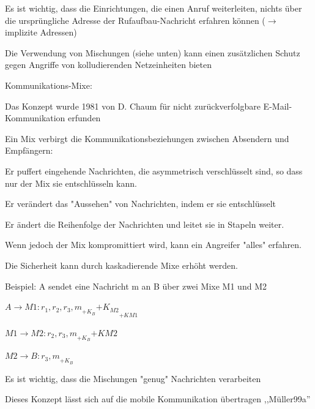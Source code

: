 \documentclass[a4paper]{article}
\begin{document}
\begin{multicols}{3}
\begin{itemize*}
\begin{itemize*}
\begin{itemize*}
                        \item Es ist wichtig, dass die Einrichtungen, die einen Anruf weiterleiten, nichts über die ursprüngliche Adresse der Rufaufbau-Nachricht erfahren können ($\rightarrow$ implizite Adressen)
                        \item Die Verwendung von Mischungen (siehe unten) kann einen zusätzlichen Schutz gegen Angriffe von kolludierenden Netzeinheiten bieten
                  \end{itemize*}
            \end{itemize*}
            \item Kommunikations-Mixe:
            \begin{itemize*}
                  \item Das Konzept wurde 1981 von D. Chaum für nicht zurückverfolgbare E-Mail-Kommunikation erfunden
                  \item Ein Mix verbirgt die Kommunikationsbeziehungen zwischen Absendern und Empfängern:
                  \begin{itemize*}
                        \item Er puffert eingehende Nachrichten, die asymmetrisch verschlüsselt sind, so dass nur der Mix sie entschlüsseln kann.
                        \item Er verändert das "Aussehen" von Nachrichten, indem er sie entschlüsselt
                        \item Er ändert die Reihenfolge der Nachrichten und leitet sie in Stapeln weiter.
                        \item Wenn jedoch der Mix kompromittiert wird, kann ein Angreifer "alles" erfahren.
                  \end{itemize*}
                  \item Die Sicherheit kann durch kaskadierende Mixe erhöht werden.
                  \item Beispiel: A sendet eine Nachricht m an B über zwei Mixe M1 und M2
                  \begin{itemize*}
                        \item $A\rightarrow M1: {r_1 ,{r_2 ,{r_3 , m}_{{+K_B}}}{+K_{M2}}}_{{+K}{M1}}$
                        \item $M1\rightarrow M2:{r_2 ,{r_3 , m}_{{+K_B}}}{+K{M2}}$
                        \item $M2\rightarrow B: {r_3 , m}_{+K_B}$
                        \item Es ist wichtig, dass die Mischungen "genug" Nachrichten verarbeiten
                  \end{itemize*}
                  \item Dieses Konzept lässt sich auf die mobile Kommunikation übertragen ,,Müller99a''
            \end{itemize*}
      \end{itemize*}


\end{multicols}
\end{document}

